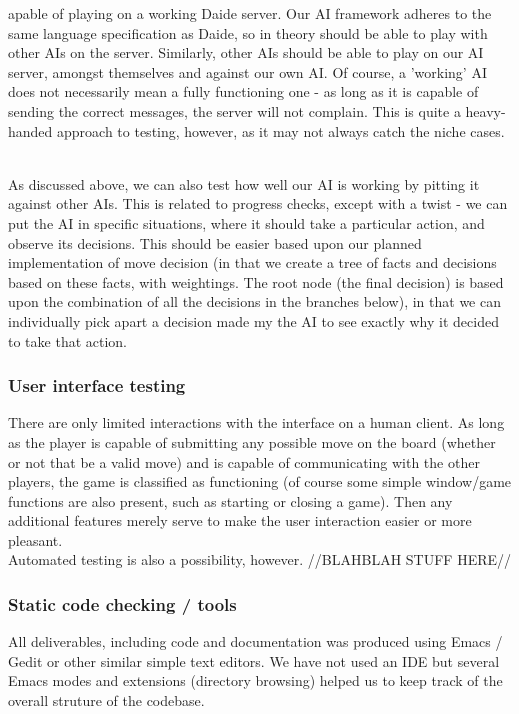 \documentclass[11pt]{article}
\begin{document}
\begin{itemize}
 
 apable of playing on a working Daide server. Our AI framework adheres to the
same language specification as Daide, so in theory should be able to play with
other AIs on the server. Similarly, other AIs should be able to play on our AI
server, amongst themselves and against our own AI. Of course, a 'working' AI 
does not necessarily mean a fully functioning one - as long as it is capable of
sending the correct messages, the server will not complain. This is quite a 
heavy-handed approach to testing, however, as it may not always catch the niche
cases.

\end{itemize}
\\
As discussed above, we can also test how well our AI is working by pitting it
against other AIs. This is related to progress checks, except with a twist - we
can put the AI in specific situations, where it should take a particular action,
and observe its decisions. This should be easier based upon our planned 
implementation of move decision (in that we create a tree of facts and decisions
based on these facts, with weightings. The root node (the final decision) is 
based upon the combination of all the decisions in the branches below), in that
we can individually pick apart a decision made my the AI to see exactly why it
decided to take that action.

\subsubsection{User interface testing}
There are only limited interactions with the interface on a human client. As 
long as the player is capable of submitting any possible move on the board
(whether or not that be a valid move) and is capable of communicating with the
other players, the game is classified as functioning (of course some simple 
window/game functions are also present, such as starting or closing a game).
Then any additional features merely serve to make the user interaction easier 
or more pleasant.
\\
Automated testing is also a possibility, however. //BLAHBLAH STUFF HERE//

\subsubsection{Static code checking / tools}
All deliverables, including code and documentation was produced using Emacs /
Gedit or other similar simple text editors. We have not used an IDE but several
Emacs modes and extensions (directory browsing) helped us to keep track of the
overall struture of the codebase. 
\end{document}
